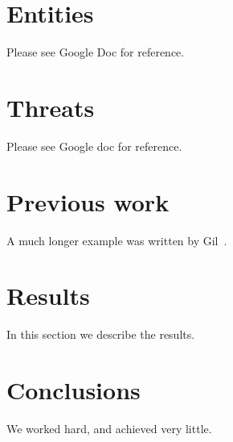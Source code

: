 \documentclass[12pt]{article}
\begin{document}
\section{Entities}
Please see Google Doc for reference.




\section{Threats}
Please see Google doc for reference.




\section{Previous work}\label{previous work}
A much longer example was written by Gil~\cite{Gil:02}.

\section{Results}\label{results}
In this section we describe the results.

\section{Conclusions}\label{conclusions}
We worked hard, and achieved very little.



\end{document}
